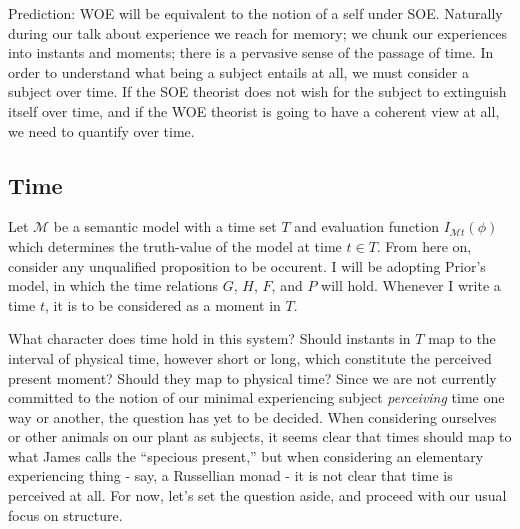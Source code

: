 \documentclass[leqno]{article}
\newcommand{\temporaleval}[2]{ I_{\mathcal{M}#1}(#2) }
\newcommand{\note}{}
\begin{document}
	\note{Prediction: WOE will be equivalent to the notion of a self under SOE.}
	Naturally during our talk about experience we reach for memory; we chunk our experiences
	into instants and moments; there is a pervasive sense of the passage of time. In
	order to understand what being a subject entails at all, we must consider a
	subject over time. If the SOE theorist does not wish for the subject to extinguish
	itself over time, and if the WOE theorist is going to have a coherent view at
	all, we need to quantify over time.

	\subsection{Time}

	Let $\mathcal{M}$ be a semantic model with a time set $T$ and evaluation
	function $\temporaleval{t}{\phi}$ which determines the truth-value of the
	model at time $t\in T$. From here on, consider any unqualified proposition to
	be occurent. I will be adopting Prior's model, in which the time relations $G$,
	$H$, $F$, and $P$ will hold. Whenever I write a time $t$, it is to be considered
	as a moment in $T$.

	What character does time hold in this system? Should instants in $T$ map to
	the interval of physical time, however short or long, which constitute the
	perceived present moment? Should they map to physical time? Since we are not
	currently committed to the notion of our minimal experiencing subject \emph{perceiving}
	time one way or another, the question has yet to be decided. When considering ourselves
	or other animals on our plant as subjects, it seems clear that times should
	map to what James calls the \enquote{specious present,} but when considering an
	elementary experiencing thing - say, a Russellian monad - it is not clear that
	time is perceived at all. For now, let's set the question aside, and proceed with
	our usual focus on structure.
\end{document}
